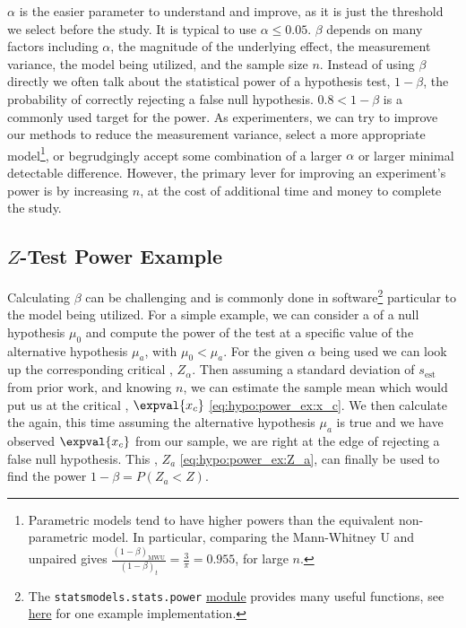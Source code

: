 $\alpha$ is the easier parameter to understand and improve,
as it is just the \pvalue threshold we select before the study.
It is typical to use $\alpha \leq \num{0.05}$.
$\beta$ depends on many factors including
$\alpha$,
the magnitude of the underlying effect,
the measurement variance,
the model being utilized,
and the sample size $n$.
Instead of using $\beta$ directly we often talk about the statistical power of a hypothesis test, $1-\beta$,
\ie the probability of correctly rejecting a false null hypothesis.
$\num{0.8} < 1-\beta$ is a commonly used target for the power.
As experimenters, we can
try to improve our methods to reduce the measurement variance,
select a more appropriate model\footnote{Parametric
models tend to have higher powers than the equivalent non-parametric model.
In particular, comparing
the Mann-Whitney U and unpaired \ttest gives $\frac{\left(1-\beta\right)_{\text{MWU}}}{\left(1-\beta\right)_{t}} = \frac{3}{\pi} = \num{0.955}$,
for large $n$.},
or begrudgingly accept some combination of a larger $\alpha$ or larger minimal detectable difference.
However, the primary lever for improving an experiment's power is by increasing $n$,
at the cost of additional time and money to complete the study.

\subsection{\texorpdfstring{$Z$}{Z}-Test Power Example}
\label{hypo:power:Z_example}

Calculating $\beta$ can be challenging and is commonly done in software\footnote{The \texttt{statsmodels.stats.power}
\href{https://www.statsmodels.org/stable/stats.html\#power-and-sample-size-calculations}{module}
provides many useful functions, see \href{https://machinelearningmastery.com/statistical-power-and-power-analysis-in-python/}{here} for one example implementation.} particular to the model being utilized.
For a simple example, we can consider a \Ztest of a null hypothesis $\mu_{0}$
and compute the power of the test at a specific value of the alternative hypothesis $\mu_{a}$, with $\mu_{0} < \mu_{a}$.
For the given $\alpha$ being used we can look up the corresponding critical \Zscore, $Z_{\alpha}$.
Then assuming a standard deviation of $s_{\text{est}}$ from prior work,
and knowing $n$, we can estimate the sample mean
which would put us at the critical \Zscore, $\expval{x_{c}}$ \cref{eq:hypo:power_ex:x_c}.
We then calculate the \Zscore again, this time assuming the alternative hypothesis $\mu_{a}$ is true
and we have observed $\expval{x_{c}}$ from our sample, \ie we are right at the edge of rejecting a false null hypothesis.
This \Zscore, $Z_{a}$ \cref{eq:hypo:power_ex:Z_a}, can finally be used to find the power $1-\beta = P\left(Z_{a} < Z\right)$.

